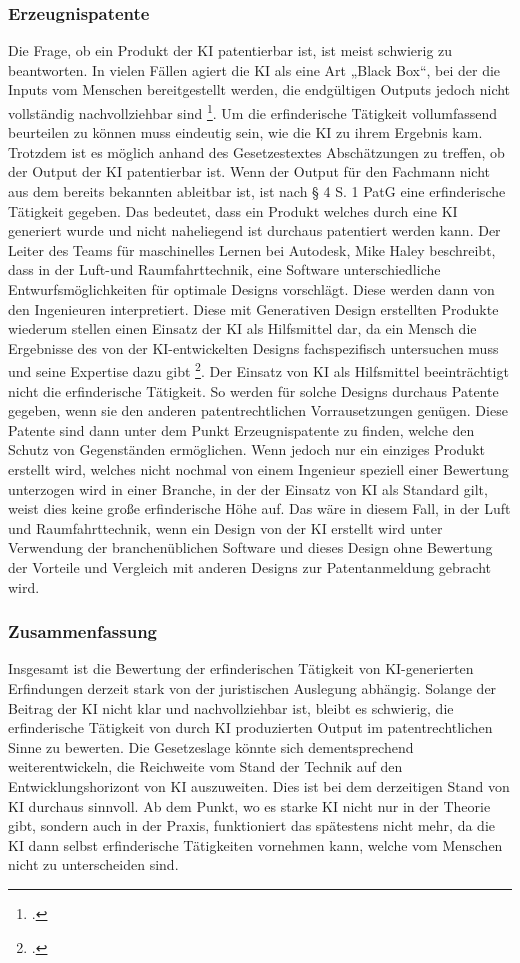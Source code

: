 \subsubsection{Erzeugnispatente}
Die Frage, ob ein Produkt der KI patentierbar ist, ist
meist schwierig zu beantworten.
In vielen Fällen agiert die KI als eine Art „Black Box“, 
bei der die Inputs vom Menschen bereitgestellt werden, 
die endgültigen Outputs jedoch nicht vollständig nachvollziehbar sind 
\footcite{pauliniKIgenerierteErfindungPatentrechtliche}. 
Um die erfinderische Tätigkeit vollumfassend beurteilen zu können
muss eindeutig sein, wie die KI zu ihrem Ergebnis kam. 
Trotzdem ist es möglich anhand des Gesetzestextes Abschätzungen
zu treffen, ob der Output der KI patentierbar ist.
Wenn der Output für den Fachmann nicht aus dem bereits bekannten 
ableitbar ist, ist nach § 4 S. 1 PatG eine erfinderische Tätigkeit gegeben.
Das bedeutet, dass ein Produkt welches durch eine KI generiert
wurde und nicht naheliegend ist durchaus patentiert werden kann.
Der Leiter des Teams für maschinelles Lernen bei Autodesk,
Mike Haley beschreibt, dass in der Luft-und Raumfahrttechnik,
eine Software unterschiedliche Entwurfsmöglichkeiten für optimale
Designs vorschlägt. Diese werden dann von den Ingenieuren interpretiert.
Diese mit Generativen Design erstellten Produkte
wiederum stellen einen Einsatz der KI als Hilfsmittel dar, da
ein Mensch die Ergebnisse des von der KI-entwickelten
Designs fachspezifisch untersuchen muss und seine Expertise dazu
gibt
\footcite{WieManPatente2021}. Der Einsatz von KI
als Hilfsmittel beeinträchtigt nicht die erfinderische Tätigkeit.
So werden für solche Designs durchaus Patente gegeben, 
wenn sie den anderen patentrechtlichen Vorrausetzungen genügen.
Diese Patente sind dann unter dem Punkt Erzeugnispatente zu 
finden, welche den Schutz von Gegenständen ermöglichen.
Wenn jedoch nur ein einziges Produkt erstellt wird, 
welches nicht nochmal von einem Ingenieur speziell 
einer Bewertung unterzogen wird in einer Branche, 
in der der Einsatz von KI als Standard gilt, weist 
dies keine große erfinderische Höhe auf. Das wäre in 
diesem Fall, in der Luft und Raumfahrttechnik,
wenn ein Design von der KI erstellt wird unter 
Verwendung der branchenüblichen Software
und dieses Design ohne Bewertung der Vorteile und 
Vergleich mit anderen Designs zur Patentanmeldung gebracht wird.
\subsubsection{Zusammenfassung}
Insgesamt ist die Bewertung der erfinderischen Tätigkeit
von KI-generierten Erfindungen derzeit stark von der juristischen Auslegung abhängig. 
Solange der Beitrag der KI nicht klar und nachvollziehbar ist, 
bleibt es schwierig, 
die erfinderische Tätigkeit von durch KI produzierten Output
im patentrechtlichen Sinne zu bewerten.
Die Gesetzeslage könnte sich dementsprechend weiterentwickeln, 
die Reichweite 
vom Stand der Technik auf den Entwicklungshorizont von KI auszuweiten.
Dies ist bei dem derzeitigen Stand von KI durchaus sinnvoll.
Ab dem Punkt, wo es starke KI nicht nur in der Theorie gibt,
sondern auch in der Praxis, funktioniert das spätestens nicht mehr,
da die KI dann selbst erfinderische Tätigkeiten vornehmen kann, welche vom 
Menschen nicht zu unterscheiden sind.
